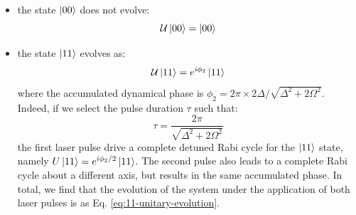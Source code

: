 \documentclass[rmp,10pt,onecolumn,fleqn,notitlepage]{revtex4-1}
\begin{document}
\begin{itemize}
    \item the state $\left\vert{00}\right\rangle$ does not evolve:
            \begin{equation}
                \mathcal{U} \left\vert{00}\right\rangle = \left\vert{00}\right\rangle
            \end{equation}
       
    \item the state $\left\vert{11}\right\rangle$ evolves as:
            \begin{equation}
                \mathcal{U} \left\vert{11}\right\rangle = e^{i\phi_2} \left\vert{11}\right\rangle
                \label{eq:11-unitary-evolution}
            \end{equation}    
    where the accumulated dynamical phase is $\phi_2= 2\pi \times 2 \Delta / \sqrt{\Delta^2+2\Omega^2}$. 
    Indeed, if we select the pulse duration $\tau$ such that:
    \begin{equation}
        \tau = \frac{2\pi}{ \sqrt{\Delta^2+2\Omega^2} }
    \end{equation}
    the first laser pulse drive a complete detuned Rabi cycle for the $\left\vert{11}\right\rangle$ state, namely $U\left\vert{11}\right\rangle=e^{i\phi_2/2}\left\vert{11}\right\rangle$. The second pulse also leads to a complete Rabi cycle about a different axis, but results in the same accumulated phase. In total, we find that the evolution of the system under the application of both laser pulses is as Eq. \eqref{eq:11-unitary-evolution}.
   

\end{itemize}
\end{document}
